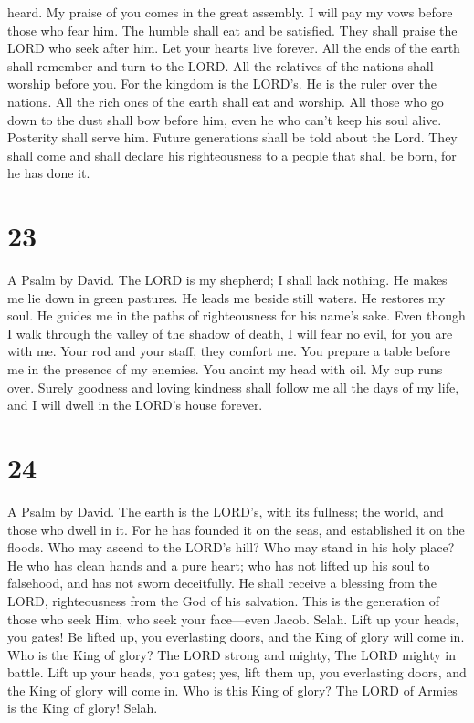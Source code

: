 heard.  My praise of you comes in the great assembly. I
will pay my vows before those who fear him.  The humble
shall eat and be satisfied. They shall praise the LORD who seek after
him. Let your hearts live forever.  All the ends of the
earth shall remember and turn to the LORD. All the relatives of the
nations shall worship before you.  For the kingdom is the
LORD's. He is the ruler over the nations.  All the rich
ones of the earth shall eat and worship. All those who go down to the
dust shall bow before him, even he who can't keep his soul alive.
 Posterity shall serve him. Future generations shall be
told about the Lord.  They shall come and shall declare his
righteousness to a people that shall be born, for he has done it.

\hypertarget{section-22}{%
\section{23}\label{section-22}}

A Psalm by David.  The LORD is my shepherd; I shall lack
nothing.  He makes me lie down in green pastures. He leads
me beside still waters.  He restores my soul. He guides me
in the paths of righteousness for his name's sake.  Even
though I walk through the valley of the shadow of death, I will fear no
evil, for you are with me. Your rod and your staff, they comfort me.
 You prepare a table before me in the presence of my
enemies. You anoint my head with oil. My cup runs over. 
Surely goodness and loving kindness shall follow me all the days of my
life, and I will dwell in the LORD's house forever.

\hypertarget{section-23}{%
\section{24}\label{section-23}}

A Psalm by David.  The earth is the LORD's, with its
fullness; the world, and those who dwell in it.  For he has
founded it on the seas, and established it on the floods. 
Who may ascend to the LORD's hill? Who may stand in his holy place?
 He who has clean hands and a pure heart; who has not lifted
up his soul to falsehood, and has not sworn deceitfully.  He
shall receive a blessing from the LORD, righteousness from the God of
his salvation.  This is the generation of those who seek
Him, who seek your face---even Jacob. Selah.  Lift up your
heads, you gates! Be lifted up, you everlasting doors, and the King of
glory will come in.  Who is the King of glory? The LORD
strong and mighty, The LORD mighty in battle.  Lift up your
heads, you gates; yes, lift them up, you everlasting doors, and the King
of glory will come in.  Who is this King of glory? The LORD
of Armies is the King of glory! Selah.

